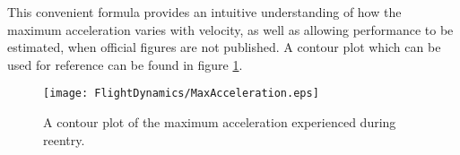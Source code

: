 This convenient formula provides an intuitive understanding of how the maximum acceleration varies with velocity, as well as allowing performance to be estimated, when official figures are not published. A contour plot which can be used for reference can be found in figure \ref{fig:MaxReentryAcceleration}.


\begin{figure}[!htb] 
    \centering
    \texttt{[image: FlightDynamics/MaxAcceleration.eps]} 
    \caption{A contour plot of the maximum acceleration experienced during reentry.}
    \label{fig:MaxReentryAcceleration}
\end{figure}


